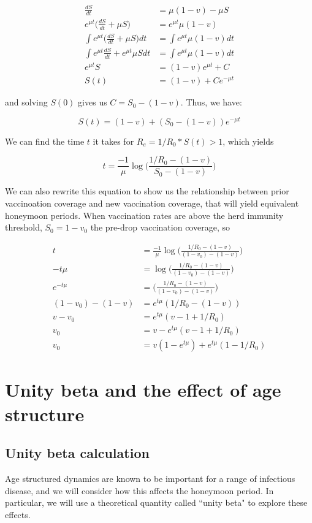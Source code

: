 \documentclass[12pt]{article}
\begin{document}
\begin{align}
    \frac{dS}{dt} &= \mu (1-v) - \mu S \\
    e^{\mu t}\Big(\frac{dS}{dt} + \mu S \Big) &= e^{\mu t} \mu (1-v) \\
    \int e^{\mu t}\Big(\frac{dS}{dt} + \mu S \Big) dt &= \int e^{\mu t} \mu (1-v) dt \\
    \int e^{\mu t}\frac{dS}{dt} + e^{\mu t}\mu S dt &= \int e^{\mu t} \mu (1-v) dt \\
    e^{\mu t} S &= (1-v) e^{\mu t} + C \\
    S(t) &= (1-v) + C e^{-\mu t}
\end{align}

\noindent
and solving $S(0)$ gives us $C = S_0 - (1-v)$.
Thus, we have:

$$
S(t) = (1-v) + (S_0 - (1-v)) e^{-\mu t}
$$

\noindent
We can find the time $t$ it takes for $R_e = 1/R_0 * S(t) > 1$, which yields

$$
t = \frac{-1}{\mu} \log \Big(\frac{1/R_0 - (1-v)}{S_0 - (1-v)}\Big)
$$

\noindent
We can also rewrite this equation to show us the relationship between prior vaccinoation coverage and new vaccination coverage, that will yield equivalent honeymoon periods. When vaccination rates are above the herd immunity threshold, $S_0 = 1-v_0$ the pre-drop vaccination coverage, so 

\begin{align}
    t &= \frac{-1}{\mu} \log \Big(\frac{1/R_0 - (1-v)}{(1-v_0) - (1-v)}\Big) \\
    - t \mu &= \log \Big(\frac{1/R_0 - (1-v)}{(1-v_0) - (1-v)}\Big) \\
    e^{- t \mu} &= \Big(\frac{1/R_0 - (1-v)}{(1-v_0) - (1-v)}\Big) \\
    (1-v_0) - (1-v) &= e^{t \mu} (1/R_0 - (1-v)) \\
    v - v_0 &= e^{t \mu} (v - 1 + 1/R_0) \\
    v_0 &= v - e^{t \mu} (v - 1 + 1/R_0) \\
    v_0 &= v(1 - e^{t \mu}) + e^{t \mu} (1 - 1/R_0)
\end{align}

\section{Unity beta and the effect of age structure}
\subsection{Unity beta calculation}
Age structured dynamics are known to be important for a range of infectious disease, and we will consider how this affects the honeymoon period. In particular, we will use a theoretical quantity called ``unity beta"  to explore these effects. 
\end{document}
